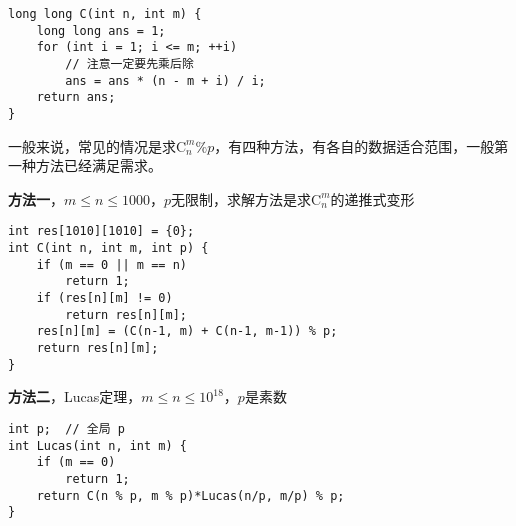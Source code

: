 \begin{lstlisting}
long long C(int n, int m) {
	long long ans = 1;
	for (int i = 1; i <= m; ++i)
		// 注意一定要先乘后除
		ans = ans * (n - m + i) / i;
	return ans;
}
\end{lstlisting}

一般来说，常见的情况是求$\textrm{C}_n^m\%p$，有四种方法，有各自的数据适合范围，一般第一种方法已经满足需求。

\textbf{方法一}，$m\leq n\leq 1000$，$p$无限制，求解方法是求$\textrm{C}_n^m$的递推式变形

\begin{lstlisting}
int res[1010][1010] = {0};
int C(int n, int m, int p) {
	if (m == 0 || m == n)
		return 1;
	if (res[n][m] != 0)
		return res[n][m];
	res[n][m] = (C(n-1, m) + C(n-1, m-1)) % p;
	return res[n][m];
}
\end{lstlisting}

\textbf{方法二}，Lucas定理，$m\leq n\leq 10^{18}$，$p$是素数

\begin{lstlisting}
int p;	// 全局 p 
int Lucas(int n, int m) {
	if (m == 0)
		return 1;
	return C(n % p, m % p)*Lucas(n/p, m/p) % p;
}
\end{lstlisting}
